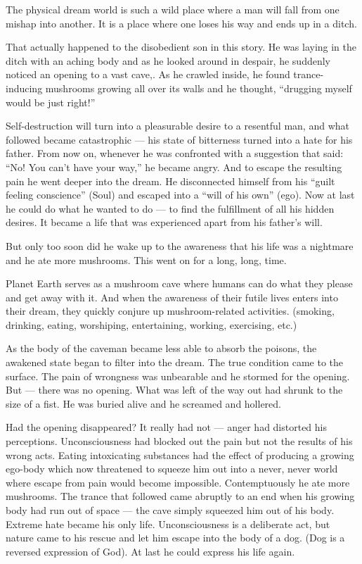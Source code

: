 \documentclass[12pt,letterpaper]{article}
\newcommand{\emdash}{---}
\begin{document}
The physical dream world is such a wild place where a man will fall
from one mishap into another. It is a place where one loses his way
and ends up in a ditch.

That actually happened to the disobedient son in this story. He was
laying in the ditch with an aching body and as he looked around in
despair, he suddenly noticed an opening to a vast cave,. As he crawled
inside, he found trance-inducing mushrooms growing all over its walls
and he thought, ``drugging myself would be just right!''

Self-destruction will turn into a pleasurable desire to a resentful
man, and what followed became catastrophic {\emdash} his state of
bitterness turned into a hate for his father. From now on, whenever he
was confronted with a suggestion that said: ``No! You can't have your
way,'' he became angry. And to escape the resulting pain he went
deeper into the dream. He disconnected himself from his ``guilt
feeling conscience'' (Soul) and escaped into a ``will of his own''
(ego). Now at last he could do what he wanted to do {\emdash} to find
the fulfillment of all his hidden desires. It became a life that was
experienced apart from his father's will.

But only too soon did he wake up to the awareness that his life was a
nightmare and he ate more mushrooms. This went on for a long, long,
time.

Planet Earth serves as a mushroom cave where humans can do what they
please and get away with it. And when the awareness of their futile
lives enters into their dream, they quickly conjure up
mushroom-related activities. (smoking, drinking, eating, worshiping,
entertaining, working, exercising, etc.)

As the body of the caveman became less able to absorb the poisons, the
awakened state began to filter into the dream. The true condition came
to the surface. The pain of wrongness was unbearable and he stormed
for the opening.  But {\emdash} there was no opening. What was left of
the way out had shrunk to the size of a fist. He was buried alive and
he screamed and hollered.

Had the opening disappeared? It really had not {\emdash} anger had
distorted his perceptions. Unconsciousness had blocked out the pain
but not the results of his wrong acts. Eating intoxicating substances
had the effect of producing a growing ego-body which now threatened to
squeeze him out into a never, never world where escape from pain would
become impossible. Contemptuously he ate more mushrooms. The trance
that followed came abruptly to an end when his growing body had run
out of space --- the cave simply squeezed him out of his body. Extreme
hate became his only life. Unconsciousness is a deliberate act, but
nature came to his rescue and let him escape into the body of a
dog. (Dog is a reversed expression of God). At last he could express
his life again.
\end{document}
